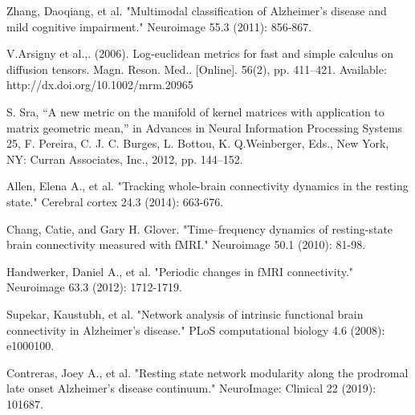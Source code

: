 \documentclass[preprint,12pt]{elsarticle}
\begin{document}
\begin{thebibliography}{1}
			Zhang, Daoqiang, et al. "Multimodal classification of Alzheimer's disease and mild cognitive impairment." Neuroimage 55.3 (2011): 856-867.
			
			V.Arsigny et al.,. (2006). Log-euclidean metrics for fast and simple calculus
			on diffusion tensors. Magn. Reson. Med.. [Online]. 56(2), pp. 411–421.
			Available: http://dx.doi.org/10.1002/mrm.20965
			
			S. Sra, “A new metric on the manifold of kernel matrices with application
			to matrix geometric mean,” in Advances in Neural Information Processing
			Systems 25, F. Pereira, C. J. C. Burges, L. Bottou, K. Q.Weinberger, Eds.,
			New York, NY: Curran Associates, Inc., 2012, pp. 144–152.
			
			Allen, Elena A., et al. "Tracking whole-brain connectivity dynamics in the resting state." Cerebral cortex 24.3 (2014): 663-676.
			
			Chang, Catie, and Gary H. Glover. "Time–frequency dynamics of resting-state brain connectivity measured with fMRI." Neuroimage 50.1 (2010): 81-98.
			
			Handwerker, Daniel A., et al. "Periodic changes in fMRI connectivity." Neuroimage 63.3 (2012): 1712-1719.
			
			Supekar, Kaustubh, et al. "Network analysis of intrinsic functional brain connectivity in Alzheimer's disease." PLoS computational biology 4.6 (2008): e1000100.
			
			Contreras, Joey A., et al. "Resting state network modularity along the prodromal late onset Alzheimer's disease continuum." NeuroImage: Clinical 22 (2019): 101687.
		
		
	
	
\end{thebibliography}
\end{document}
